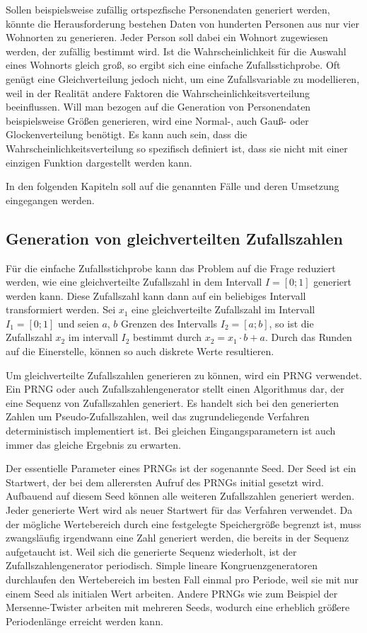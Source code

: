 Sollen beispielsweise zufällig ortspezfische Personendaten generiert werden, könnte die Herausforderung bestehen Daten von hunderten Personen aus nur vier Wohnorten zu generieren. Jeder Person soll dabei ein Wohnort zugewiesen werden, der zufällig bestimmt wird. Ist die Wahrscheinlichkeit für die Auswahl eines Wohnorts gleich groß, so ergibt sich eine einfache Zufallsstichprobe. Oft genügt eine Gleichverteilung jedoch nicht, um eine Zufallsvariable zu modellieren, weil in der Realität andere Faktoren die Wahrscheinlichkeitsverteilung beeinflussen. Will man bezogen auf die Generation von Personendaten beispielsweise Größen generieren, wird eine Normal-, auch Gauß- oder Glockenverteilung benötigt. Es kann auch sein, dass die Wahrscheinlichkeitsverteilung so spezifisch definiert ist, dass sie nicht mit einer einzigen Funktion dargestellt werden kann.

In den folgenden Kapiteln soll auf die genannten Fälle und deren Umsetzung eingegangen werden.

\subsection{Generation von gleichverteilten Zufallszahlen}

Für die einfache Zufallsstichprobe kann das Problem auf die Frage reduziert werden, wie eine gleichverteilte Zufallszahl in dem Intervall $I=[0;1]$ generiert werden kann. Diese Zufallszahl kann dann auf ein beliebiges Intervall transformiert werden. Sei $x_1$ eine gleichverteilte Zufallszahl im Intervall $I_1=[0;1]$ und seien $a$, $b$ Grenzen des Intervalls $I_2=[a;b]$, so ist die Zufallszahl $x_2$ im intervall $I_2$ bestimmt durch $x_2=x_1 \cdot b+a$. Durch das Runden auf die Einerstelle, können so auch diskrete Werte resultieren.

Um gleichverteilte Zufallszahlen generieren zu können, wird ein \ac{PRNG} verwendet. Ein \ac{PRNG} oder auch Zufallszahlengenerator stellt einen Algorithmus dar, der eine Sequenz von Zufallszahlen generiert. Es handelt sich bei den generierten Zahlen um Pseudo-Zufallszahlen, weil das zugrundeliegende Verfahren deterministisch implementiert ist. Bei gleichen Eingangsparametern ist auch immer das gleiche Ergebnis zu erwarten. 

Der essentielle Parameter eines \ac{PRNG}s ist der sogenannte Seed. Der Seed ist ein Startwert, der bei dem allerersten Aufruf des \ac{PRNG}s initial gesetzt wird. Aufbauend auf diesem Seed können alle weiteren Zufallszahlen generiert werden. Jeder generierte Wert wird als neuer Startwert für das Verfahren verwendet. Da der mögliche Wertebereich durch eine festgelegte Speichergröße begrenzt ist, muss zwangsläufig irgendwann eine Zahl generiert werden, die bereits in der Sequenz aufgetaucht ist. Weil sich die generierte Sequenz wiederholt, ist der Zufallszahlengenerator periodisch. Simple lineare Kongruenzgeneratoren durchlaufen den Wertebereich im besten Fall einmal pro Periode, weil sie mit nur einem Seed als initialen Wert arbeiten. Andere \ac{PRNG}s wie zum Beispiel der Mersenne-Twister arbeiten mit mehreren Seeds, wodurch eine erheblich größere Periodenlänge erreicht werden kann.

